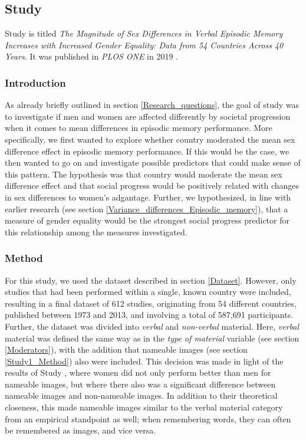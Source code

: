 \subsection{Study } \label{Social_study}

Study  is titled \emph{The Magnitude of Sex Differences in Verbal Episodic Memory Increases with Increased Gender Equality: Data from 54 Countries Across 40 Years}. It was published in \emph{PLOS ONE} in 2019 \parencite{Asperholm2019b}.

\subsubsection{Introduction}

As already briefly outlined in section \ref{Research_questions}, the goal of study  was to investigate if men and women are affected differently by societal progression when it comes to mean differences in episodic memory performance. More specifically, we first wanted to explore whether country moderated the mean sex difference effect in episodic memory performance. If this would be the case, we then wanted to go on and investigate possible predictors that could make sense of this pattern. The hypothesis was that country would moderate the mean sex difference effect and that social progress would be positively related with changes in sex differences to women's adgantage. Further, we hypothesized, in line with earlier research (see section \ref{Variance_differences_Episodic_memory}), that a measure of gender equality would be the strongest social progress predictor for this relationship among the measures investigated.

\subsubsection{Method}

For this study, we used the dataset described in section \ref{Dataset}. However, only studies that had been performed within a single, known country were included, resulting in a final dataset of 612 studies, originating from 54 different countries, published between 1973 and 2013, and involving a total of 587,691 participants. Further, the dataset was divided into \emph{verbal} and \emph{non-verbal} material. Here, \emph{verbal} material was defined the same way as in the \emph{type of material} variable (see section \ref{Moderators}), with the addition that nameable images (see section \ref{Study1_Method}) also were included. This decision was made in light of the results of Study , where women did not only perform better than men for nameable images, but where there also was a significant difference between nameable images and non-nameable images. In addition to their theoretical closeness, this made nameable images similar to the verbal material category from an empirical standpoint as well; when remembering words, they can often be remembered as images, and vice versa.

